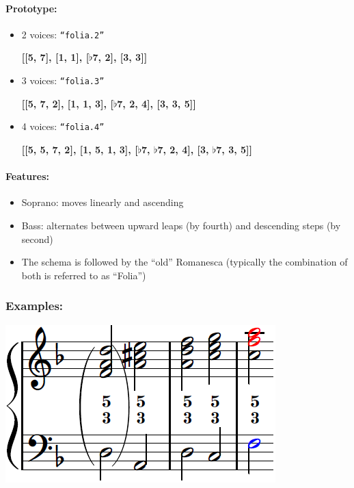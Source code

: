 \documentclass[11pt, openany]{article}
\begin{document}
\paragraph{Prototype:}
\begin{itemize}
\item 2 voices: \texttt{“folia.2”}
	\begin{center}
	\textbf{[[5, 7], [1, 1], [$\flat$7, 2], [3, 3]]}
	\end{center}
\item 3 voices: \texttt{“folia.3”}
	\begin{center}
	\textbf{[[5, 7, 2], [1, 1, 3], [$\flat$7, 2, 4], [3, 3, 5]]}
	\end{center}
\item 4 voices: \texttt{“folia.4”}
	\begin{center}
	\textbf{[[5, 5, 7, 2], [1, 5, 1, 3], [$\flat$7, $\flat$7, 2, 4], [3, $\flat$7, 3, 5]]}
	\end{center}
\end{itemize}

\paragraph{Features:}
\begin{itemize}
\item Soprano: moves linearly and ascending
\item Bass: alternates between upward leaps (by fourth) and descending steps (by second)
\item The schema is followed by the “old” Romanesca (typically the combination of both is referred to as “Folia”)
\end{itemize}

\subsubsection{Examples:}
\begin{center}
\includegraphics[scale=0.8]{folia.png}
\end{center}
\end{document}
